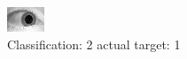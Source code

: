 \begin{figure}[h!]
\begin{center}
\includegraphics[width=0.60\columnwidth]{figures/ID1597_class_2_target_1.png}
\end{center}
\caption{ Classification: 2 actual target: 1}
\label{fig:ID1597_class_2_target_1}
\end{figure}
